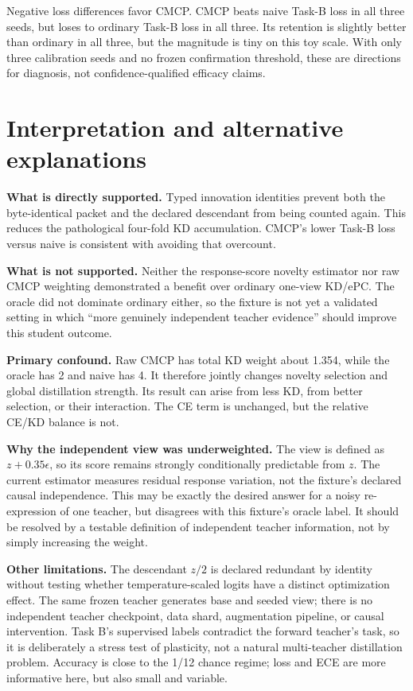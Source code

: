 \documentclass[10pt]{article}
\begin{document}
Negative loss differences favor CMCP. CMCP beats naive Task-B loss in all
three seeds, but loses to ordinary Task-B loss in all three. Its retention is
slightly better than ordinary in all three, but the magnitude is tiny on this
toy scale. With only three calibration seeds and no frozen confirmation
threshold, these are directions for diagnosis, not confidence-qualified
efficacy claims.

\section*{Interpretation and alternative explanations}

\textbf{What is directly supported.} Typed innovation identities prevent both
the byte-identical packet and the declared descendant from being counted
again. This reduces the pathological four-fold KD accumulation. CMCP's lower
Task-B loss versus naive is consistent with avoiding that overcount.

\textbf{What is not supported.} Neither the response-score novelty estimator
nor raw CMCP weighting demonstrated a benefit over ordinary one-view KD/ePC.
The oracle did not dominate ordinary either, so the fixture is not yet a
validated setting in which ``more genuinely independent teacher evidence''
should improve this student outcome.

\textbf{Primary confound.} Raw CMCP has total KD weight about 1.354, while
the oracle has 2 and naive has 4. It therefore jointly changes novelty
selection and global distillation strength. Its result can arise from less KD,
from better selection, or their interaction. The CE term is unchanged, but the
relative CE/KD balance is not.

\textbf{Why the independent view was underweighted.} The view is defined as
$z+0.35\epsilon$, so its score remains strongly conditionally predictable
from $z$. The current estimator measures residual response variation, not the
fixture's declared causal independence. This may be exactly the desired answer
for a noisy re-expression of one teacher, but disagrees with this fixture's
oracle label. It should be resolved by a testable definition of independent
teacher information, not by simply increasing the weight.

\textbf{Other limitations.} The descendant $z/2$ is declared redundant by
identity without testing whether temperature-scaled logits have a distinct
optimization effect. The same frozen teacher generates base and seeded view;
there is no independent teacher checkpoint, data shard, augmentation pipeline,
or causal intervention. Task B's supervised labels contradict the forward
teacher's task, so it is deliberately a stress test of plasticity, not a
natural multi-teacher distillation problem. Accuracy is close to the 1/12
chance regime; loss and ECE are more informative here, but also small and
variable.
\end{document}
